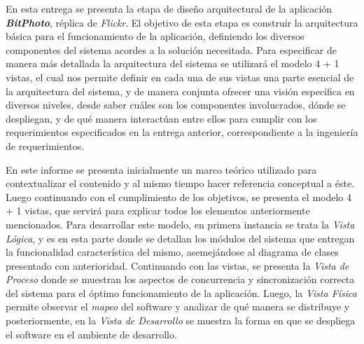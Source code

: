 \documentclass{memoria}
\begin{document}


\indices


En esta entrega se presenta la etapa de diseño arquitectural de la aplicación \textbf{\textsl{BitPhoto}}, réplica de \textsl{Flickr}.  El objetivo de esta etapa es construir la arquitectura básica para el funcionamiento de la aplicación, definiendo los diversos componentes del sistema acordes a la solución necesitada. Para especificar de manera más detallada la arquitectura del sistema se utilizará el modelo 4 + 1 vistas, el cual nos permite definir en cada una de sus vistas una parte esencial de la arquitectura del sistema, y de manera conjunta ofrecer una visión específica en diversos niveles, desde saber cuáles son los componentes involucrados, dónde se despliegan, y de qué manera interactúan entre ellos para cumplir con los requerimientos especificados en la entrega anterior, correspondiente a la ingeniería de requerimientos.
 
En este informe se presenta inicialmente un marco teórico utilizado para contextualizar el contenido y al mismo tiempo hacer referencia conceptual a éste. Luego continuando con el cumplimiento de los objetivos, se presenta el modelo 4 + 1 vistas, que servirá para explicar todos los elementos anteriormente mencionados. Para desarrollar este modelo, en primera instancia se trata la \textsl{Vista Lógica}, y es en esta parte donde se detallan los módulos del sistema que entregan la funcionalidad característica del mismo, asemejándose al diagrama de clases presentado con anterioridad. Continuando con las vistas, se presenta la \textsl{Vista de Proceso} donde se muestran los aspectos de concurrencia y sincronización correcta del sistema para el óptimo funcionamiento de la aplicación. Luego, la \textsl{Vista Física} permite observar el \textsl{mapeo} del software y analizar de qué manera se distribuye y posteriormente, en la \textsl{Vista de Desarrollo} se muestra la forma en que se despliega el software en el ambiente de desarrollo. 
\end{document}
